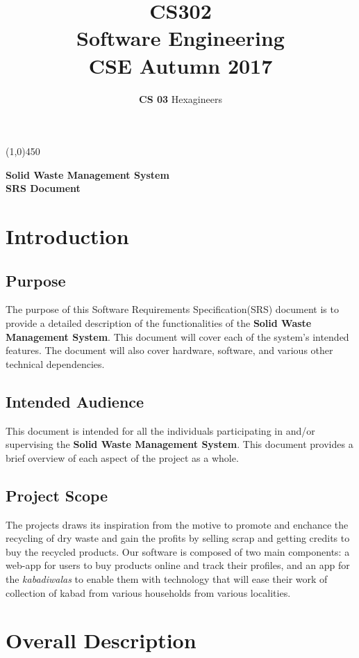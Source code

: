 \documentclass{article}
\title{\textbf{CS302}\\\HUGE Software Engineering\\
\LARGE CSE\hspace{\labelsep}\textbullet\hspace{\labelsep} Autumn 2017
}
\author{\textbf{CS 03} Hexagineers}
\begin{document}
\maketitle
\line(1,0){450}

\begin{center}

\Huge\textbf{Solid Waste Management System}\\
\Large \textbf{SRS Document}
\end{center}
\newpage
\tableofcontents
\newpage

\section{Introduction}
\subsection{Purpose}
The purpose of this Software Requirements Specification(SRS) document is to provide a detailed description of the functionalities of the \textbf{Solid Waste Management System}. This document will cover each of the  system’s intended  features. The document will also cover hardware, software, and various other technical dependencies. 

\subsection{Intended Audience} 
\par This  document  is  intended  for  all the individuals  participating  in  and/or supervising  the  \textbf{Solid Waste Management System}. 
This document provides a brief overview of each aspect of the project as a whole. 

\subsection{Project Scope}
\par The projects draws its inspiration from the motive to promote and enchance the recycling of dry waste and gain the profits by selling scrap and getting credits to buy the recycled products. Our software is composed of two main components: a web-app for users to buy products online and track their profiles, and an app for the \textit{kabadiwalas} to enable them with technology that will ease their work of collection of kabad from various households from various localities.
\newpage

\section{Overall Description}
\end{document}

